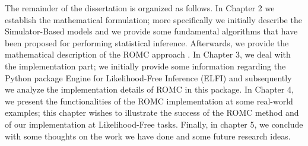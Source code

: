 The remainder of the dissertation is organized as follows. In Chapter
2 we establish the mathematical formulation; more specifically we
initially describe the Simulator-Based models and we provide some
fundamental algorithms that have been proposed for performing
statistical inference. Afterwards, we provide the mathematical
description of the ROMC approach \cite{Ikonomov2019}. In Chapter 3, we
deal with the implementation part; we initially provide some
information regarding the Python package Engine for Likelihood-Free
Inference (ELFI) \cite{1708.00707} and subsequently we analyze the
implementation details of ROMC in this package. In Chapter 4, we
present the functionalities of the ROMC implementation at some
real-world examples; this chapter wishes to illustrate the success of
the ROMC method and of our implementation at Likelihood-Free
tasks. Finally, in chapter 5, we conclude with some thoughts on the
work we have done and some future research ideas.
